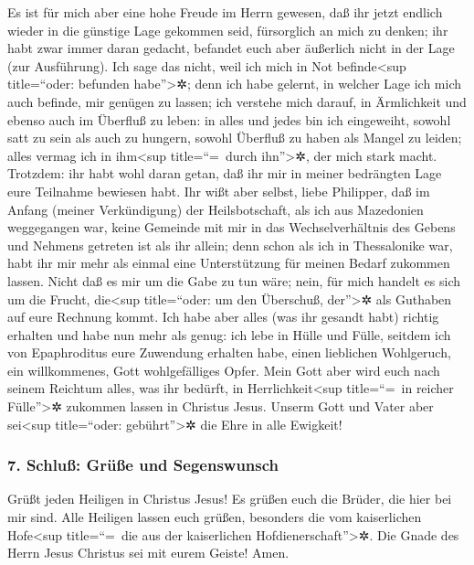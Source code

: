  Es ist für mich aber eine hohe Freude im Herrn gewesen,
daß ihr jetzt endlich wieder in die günstige Lage gekommen seid,
fürsorglich an mich zu denken; ihr habt zwar immer daran gedacht,
befandet euch aber äußerlich nicht in der Lage (zur Ausführung).
 Ich sage das nicht, weil ich mich in Not
befinde\textless sup title=``oder: befunden habe''\textgreater✲; denn
ich habe gelernt, in welcher Lage ich mich auch befinde, mir genügen zu
lassen;  ich verstehe mich darauf, in Ärmlichkeit und
ebenso auch im Überfluß zu leben: in alles und jedes bin ich eingeweiht,
sowohl satt zu sein als auch zu hungern, sowohl Überfluß zu haben als
Mangel zu leiden;  alles vermag ich in ihm\textless sup
title=``=~durch ihn''\textgreater✲, der mich stark macht.
 Trotzdem: ihr habt wohl daran getan, daß ihr mir in
meiner bedrängten Lage eure Teilnahme bewiesen habt.  Ihr
wißt aber selbst, liebe Philipper, daß im Anfang (meiner Verkündigung)
der Heilsbotschaft, als ich aus Mazedonien weggegangen war, keine
Gemeinde mit mir in das Wechselverhältnis des Gebens und Nehmens
getreten ist als ihr allein;  denn schon als ich in
Thessalonike war, habt ihr mir mehr als einmal eine Unterstützung für
meinen Bedarf zukommen lassen.  Nicht daß es mir um die
Gabe zu tun wäre; nein, für mich handelt es sich um die Frucht,
die\textless sup title=``oder: um den Überschuß, der''\textgreater✲ als
Guthaben auf eure Rechnung kommt.  Ich habe aber alles
(was ihr gesandt habt) richtig erhalten und habe nun mehr als genug: ich
lebe in Hülle und Fülle, seitdem ich von Epaphroditus eure Zuwendung
erhalten habe, einen lieblichen Wohlgeruch, ein willkommenes, Gott
wohlgefälliges Opfer.  Mein Gott aber wird euch nach
seinem Reichtum alles, was ihr bedürft, in Herrlichkeit\textless sup
title=``=~in reicher Fülle''\textgreater✲ zukommen lassen in Christus
Jesus.  Unserm Gott und Vater aber sei\textless sup
title=``oder: gebührt''\textgreater✲ die Ehre in alle Ewigkeit!

\hypertarget{schluuxdf-gruxfcuxdfe-und-segenswunsch}{%
\subsubsection{7. Schluß: Grüße und
Segenswunsch}\label{schluuxdf-gruxfcuxdfe-und-segenswunsch}}

 Grüßt jeden Heiligen in Christus Jesus! Es grüßen euch
die Brüder, die hier bei mir sind.  Alle Heiligen lassen
euch grüßen, besonders die vom kaiserlichen Hofe\textless sup
title=``=~die aus der kaiserlichen Hofdienerschaft''\textgreater✲.
 Die Gnade des Herrn Jesus Christus sei mit eurem Geiste!
Amen.

